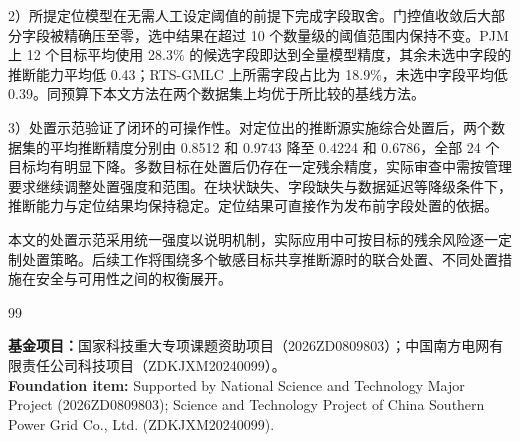 \documentclass[UTF8,zihao=5,twoside,fontset=none]{ctexart}
\begin{document}
2）所提定位模型在无需人工设定阈值的前提下完成字段取舍。门控值收敛后大部分字段被精确压至零，选中结果在超过 10 个数量级的阈值范围内保持不变。PJM 上 12 个目标平均使用 28.3\% 的候选字段即达到全量模型精度，其余未选中字段的推断能力平均低 0.43；RTS-GMLC 上所需字段占比为 18.9\%，未选中字段平均低 0.39。同预算下本文方法在两个数据集上均优于所比较的基线方法。

3）处置示范验证了闭环的可操作性。对定位出的推断源实施综合处置后，两个数据集的平均推断精度分别由 0.8512 和 0.9743 降至 0.4224 和 0.6786，全部 24 个目标均有明显下降。多数目标在处置后仍存在一定残余精度，实际审查中需按管理要求继续调整处置强度和范围。在块状缺失、字段缺失与数据延迟等降级条件下，推断能力与定位结果均保持稳定。定位结果可直接作为发布前字段处置的依据。

本文的处置示范采用统一强度以说明机制，实际应用中可按目标的残余风险逐一定制处置策略。后续工作将围绕多个敏感目标共享推断源时的联合处置、不同处置措施在安全与可用性之间的权衡展开。

\balance
\begin{thebibliography}{99}
\setlength{\itemsep}{0.15ex}\setlength{\parskip}{0pt}

\end{thebibliography}

\vspace{0.6em}
\noindent\begin{minipage}{\columnwidth}
{\textbf{基金项目：}国家科技重大专项课题资助项目（2026ZD0809803）；中国南方电网有限责任公司科技项目（ZDKJXM20240099）。\\
\textbf{Foundation item:} Supported by National Science and Technology Major Project (2026ZD0809803); Science and Technology Project of China Southern Power Grid Co., Ltd. (ZDKJXM20240099).}
\end{minipage}

\vspace{0.6em}
\end{document}
